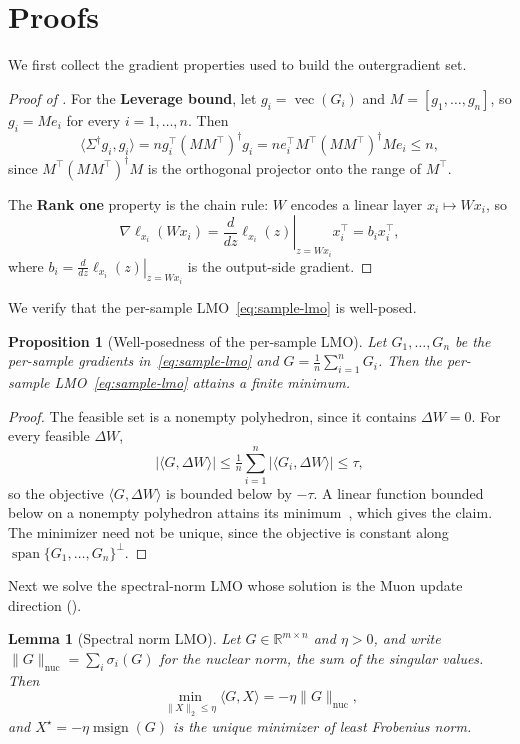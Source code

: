 \documentclass[11pt]{article}
\renewcommand{\vec}{\operatorname{vec}}
\newcommand{\ip}[1]{\langle #1 \rangle}
\DeclareMathOperator{\msign}{msign}
\newcommand{\norm}[1]{\| #1\|}
\theoremstyle{plain}
\newtheorem{lemma}{Lemma}
\newtheorem{proposition}{Proposition}
\theoremstyle{definition}
\theoremstyle{remark}
\theoremstyle{definition}
\begin{document}
\section{Proofs}
\label{app:proofs}

We first collect the gradient properties used to build the outergradient set.
\gradprop*
\begin{proof}[Proof of ]
For the {\bf Leverage bound}, let $g_i=\vec(G_i)$ and
$M=[g_1,\ldots,g_n]$, so $g_i = Me_i$ for every $i =1,\ldots, n$. Then
\[
\ip{\Sigma^\dagger g_i, g_i} = ng_i^\top (MM^\top)^{\dagger} g_i = n e_i^\top M^\top  (MM^\top)^{\dagger} M e_i  \leq n,
\]
since $M^\top  (MM^\top)^{\dagger} M$ is the orthogonal projector onto the range
of $M^\top$.

The {\bf Rank one} property is the chain rule: $W$ encodes a linear layer
$x_i \mapsto W x_i$, so
\[
\nabla \ell_{x_i}(Wx_i) =  \left. \frac{d }{dz} \ell_{x_i}(z)
\right|_{z =Wx_i} x_i^\top
=b_i x_i^\top,
\]
where $b_i = \left.\frac{d }{dz} \ell_{x_i}(z)  \right|_{z =Wx_i}$ is the
output-side gradient.
\end{proof}

We verify that the per-sample LMO~\eqref{eq:sample-lmo} is well-posed.
\begin{proposition}[Well-posedness of the per-sample LMO]
\label{prop:wellposed}
Let $G_1,\dots,G_n$ be the per-sample gradients in~\eqref{eq:sample-lmo} and $G=\tfrac1n\sum_{i=1}^n G_i$. Then the per-sample LMO~\eqref{eq:sample-lmo} attains a finite minimum.
\end{proposition}
\begin{proof}
The feasible set is a nonempty polyhedron, since it contains $\Delta W=0$. For every feasible $\Delta W$,
\[
|\ip{G,\Delta W}|\le\tfrac1n\sum_{i=1}^n|\ip{G_i,\Delta W}|\le\tau,
\]
so the objective $\ip{G,\Delta W}$ is bounded below by $-\tau$. A linear function bounded below on a nonempty polyhedron attains its minimum~\cite{bertsimas1997introduction}, which gives the claim. The minimizer need not be unique, since the objective is constant along $\operatorname{span}\{G_1,\ldots,G_n\}^\perp$.
\end{proof}

Next we solve the spectral-norm LMO whose solution is the Muon update direction ().
\begin{lemma}[Spectral norm LMO]\label{lem:muon-lmo}
Let $G\in\mathbb{R}^{m\times n}$ and $\eta>0$, and write
$\norm{G}_{\mathrm{nuc}}=\sum_i\sigma_i(G)$ for the nuclear norm, the sum of the
singular values. Then
\[
    \min_{\norm{X}_2\leq \eta}\ip{G,X}
    =
    -\eta\norm{G}_{\mathrm{nuc}},
\]
and $X^\star = -\eta\msign(G)$ is the unique minimizer of least Frobenius norm.
\end{lemma}
\end{document}
